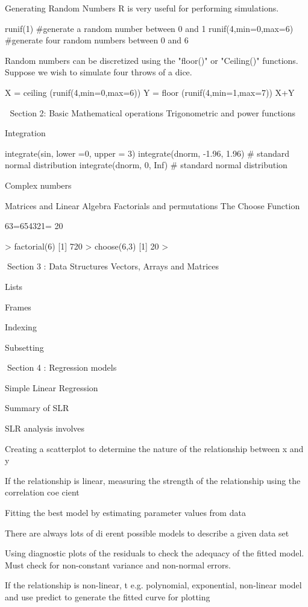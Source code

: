 Generating Random Numbers
R is very useful for performing simulations.


runif(1)										 #generate a random number between 0 and 1
runif(4,min=0,max=6) 			  #generate four random numbers between 0 and 6

Random numbers can be discretized using the "floor()" or "Ceiling()" functions. Suppose we wish to simulate four throws of a dice.

X = ceiling (runif(4,min=0,max=6))
Y = floor (runif(4,min=1,max=7))
X+Y


Section 2: Basic Mathematical operations
Trigonometric and power functions

Integration

integrate(sin, lower =0, upper = 3)
integrate(dnorm, -1.96, 1.96)					 # standard normal distribution
integrate(dnorm, 0, Inf)							   # standard normal distribution

Complex numbers 

Matrices and Linear Algebra
Factorials and permutations
The Choose Function

63=654321= 20



> factorial(6)
[1] 720
> choose(6,3)
[1] 20
> 




Section 3 : Data Structures
Vectors, Arrays and Matrices

Lists

Frames

Indexing

Subsetting

Section 4 : Regression models

Simple Linear Regression


Summary of SLR


SLR analysis involves

Creating a scatterplot to determine the nature of the relationship between x and y

If the relationship is linear, measuring the strength of the relationship using the correlation coe cient

Fitting the best model by estimating parameter values from data

There are always lots of di erent possible models to describe a given data set

Using diagnostic plots of the residuals to check the adequacy of the fitted model. Must check for non-constant variance and non-normal errors.

If the relationship is non-linear, t e.g. polynomial, exponential, non-linear model and use predict to generate the fitted curve for plotting



